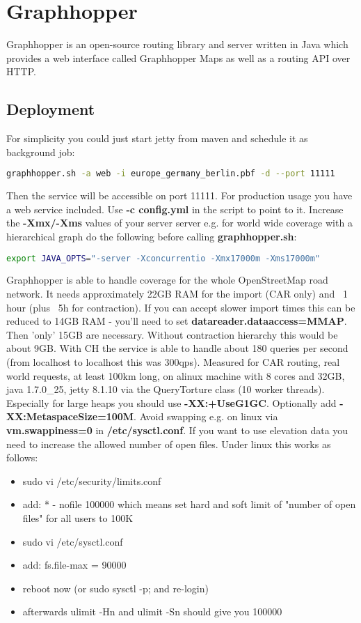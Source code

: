
\section{Graphhopper}

Graphhopper is an open-source routing library and server written in Java which provides a web
interface called Graphhopper Maps as well as a routing API over HTTP.
\subsection{Deployment}
For simplicity you could just start jetty from maven and schedule it as background job: 
\begin{lstlisting}[language=bash,breaklines=true]
graphhopper.sh -a web -i europe_germany_berlin.pbf -d --port 11111
\end{lstlisting}
Then the service will be accessible on port 11111.
For production usage you have a web service included. Use \textbf{-c config.yml} in the script to point to
it. Increase the \textbf{-Xmx/-Xms} values of your server server e.g. for world wide coverage with a
hierarchical graph do the following before calling \textbf{graphhopper.sh}:
\begin{lstlisting}[language=bash,breaklines=true]
export JAVA_OPTS="-server -Xconcurrentio -Xmx17000m -Xms17000m"
\end{lstlisting}
Graphhopper is able to handle coverage for the whole OpenStreetMap road network. It needs
approximately 22GB RAM for the import (CAR only) and ~1 hour (plus ~5h for contraction). If
you can accept slower import times this can be reduced to 14GB RAM - you'll need to set
\textbf{datareader.dataaccess=MMAP}. Then 'only' 15GB are necessary. Without contraction hierarchy this would be about 9GB. With CH the service is able to handle about 180 queries per second (from localhost to localhost this was 300qps). Measured for CAR routing, real world requests, at least 100km long, on alinux machine with 8 cores and 32GB, java 1.7.0\_25, jetty 8.1.10 via the QueryTorture class (10
worker threads).\\
Especially for large heaps you should use \textbf{-XX:+UseG1GC}. Optionally add \textbf{-XX:MetaspaceSize=100M}.
Avoid swapping e.g. on linux via \textbf{vm.swappiness=0} in \textbf{/etc/sysctl.conf}.
If you want to use elevation data you need to increase the allowed number of open files. Under
linux this works as follows:
\begin{itemize}
\item sudo vi /etc/security/limits.conf
\item add: * - nofile 100000 which means set hard and soft limit of "number of open files" for all users to 100K
\item sudo vi /etc/sysctl.conf
\item add: fs.file-max = 90000
\item reboot now (or sudo sysctl -p; and re-login)
\item afterwards ulimit -Hn and ulimit -Sn should give you 100000
\end{itemize}
